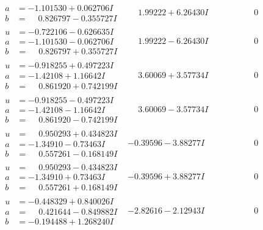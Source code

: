 \documentclass[1p]{elsarticle_modified}
\theoremstyle{definition}
\begin{document}
$$\begin{array}{c|c|c}
\begin{aligned}
a &= -1.101530 + 0.062706 I \\
b &= \phantom{-}0.826797 - 0.355727 I\end{aligned}
 & \phantom{-}1.99222 + 6.26430 I & \phantom{-0.000000 } 0 \\ \hline\begin{aligned}
u &= -0.722106 - 0.626635 I \\
a &= -1.101530 - 0.062706 I \\
b &= \phantom{-}0.826797 + 0.355727 I\end{aligned}
 & \phantom{-}1.99222 - 6.26430 I & \phantom{-0.000000 } 0 \\ \hline\begin{aligned}
u &= -0.918255 + 0.497223 I \\
a &= -1.42108 + 1.16642 I \\
b &= \phantom{-}0.861920 + 0.742199 I\end{aligned}
 & \phantom{-}3.60069 + 3.57734 I & \phantom{-0.000000 } 0 \\ \hline\begin{aligned}
u &= -0.918255 - 0.497223 I \\
a &= -1.42108 - 1.16642 I \\
b &= \phantom{-}0.861920 - 0.742199 I\end{aligned}
 & \phantom{-}3.60069 - 3.57734 I & \phantom{-0.000000 } 0 \\ \hline\begin{aligned}
u &= \phantom{-}0.950293 + 0.434823 I \\
a &= -1.34910 - 0.73463 I \\
b &= \phantom{-}0.557261 - 0.168149 I\end{aligned}
 & -0.39596 - 3.88277 I & \phantom{-0.000000 } 0 \\ \hline\begin{aligned}
u &= \phantom{-}0.950293 - 0.434823 I \\
a &= -1.34910 + 0.73463 I \\
b &= \phantom{-}0.557261 + 0.168149 I\end{aligned}
 & -0.39596 + 3.88277 I & \phantom{-0.000000 } 0 \\ \hline\begin{aligned}
u &= -0.448329 + 0.840026 I \\
a &= \phantom{-}0.421644 - 0.849882 I \\
b &= -0.194488 + 1.268240 I\end{aligned}
 & -2.82616 - 2.12943 I & \phantom{-0.000000 } 0 \\ \hline\begin{aligned}

\end{aligned}
\end{array}$$
\end{document}
